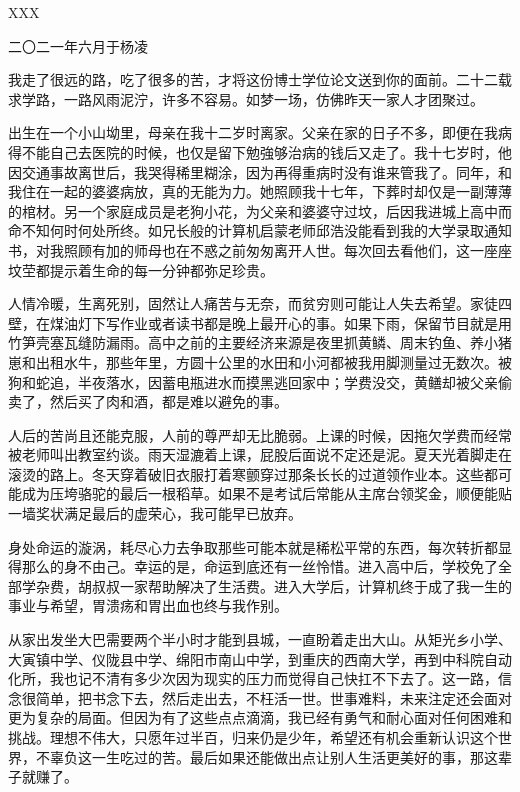 \begin{acknowledgement}
\begin{flushright}
         XXX

二〇二一年六月于\quad 杨凌
\end{flushright}

\newpage

我走了很远的路，吃了很多的苦，才将这份博士学位论文送到你的面前。二十二载求学路，一路风雨泥泞，许多不容易。如梦一场，仿佛昨天一家人才团聚过。

出生在一个小山坳里，母亲在我十二岁时离家。父亲在家的日子不多，即便在我病得不能自己去医院的时候，也仅是留下勉強够治病的钱后又走了。我十七岁时，他因交通事故离世后，我哭得稀里糊涂，因为再得重病时没有谁来管我了。同年，和我住在一起的婆婆病放，真的无能为力。她照顾我十七年，下葬时却仅是一副薄薄的棺材。另一个家庭成员是老狗小花，为父亲和婆婆守过坟，后因我进城上高中而命不知何时何处所终。如兄长般的计算机启蒙老师邱浩没能看到我的大学录取通知书，对我照顾有加的师母也在不惑之前匆匆离开人世。每次回去看他们，这一座座坟茔都提示着生命的每一分钟都弥足珍贵。

人情冷暖，生离死别，固然让人痛苦与无奈，而贫穷则可能让人失去希望。家徒四壁，在煤油灯下写作业或者读书都是晚上最开心的事。如果下雨，保留节目就是用竹笋壳塞瓦缝防漏雨。高中之前的主要经济来源是夜里抓黄鳞、周末钓鱼、养小猪崽和出租水牛，那些年里，方圆十公里的水田和小河都被我用脚测量过无数次。被狗和蛇追，半夜落水，因蓄电瓶进水而摸黑逃回家中；学费没交，黄鳝却被父亲偷卖了，然后买了肉和酒，都是难以避免的事。

人后的苦尚且还能克服，人前的尊严却无比脆弱。上课的时候，因拖欠学费而经常被老师叫出教室约谈。雨天湿漉着上课，屁股后面说不定还是泥。夏天光着脚走在滚烫的路上。冬天穿着破旧衣服打着寒颤穿过那条长长的过道领作业本。这些都可能成为压垮骆驼的最后一根稻草。如果不是考试后常能从主席台领奖金，顺便能贴一墙奖状满足最后的虚荣心，我可能早已放弃。

身处命运的漩涡，耗尽心力去争取那些可能本就是稀松平常的东西，每次转折都显得那么的身不由己。幸运的是，命运到底还有一丝怜惜。进入高中后，学校免了全部学杂费，胡叔叔一家帮助解决了生活费。进入大学后，计算机终于成了我一生的事业与希望，胃溃疡和胃出血也终与我作别。

从家出发坐大巴需要两个半小时才能到县城，一直盼着走出大山。从矩光乡小学、大寅镇中学、仪陇县中学、绵阳市南山中学，到重庆的西南大学，再到中科院自动化所，我也记不清有多少次因为现实的压力而觉得自己快扛不下去了。这一路，信念很简单，把书念下去，然后走出去，不枉活一世。世事难料，未来注定还会面对更为复杂的局面。但因为有了这些点点滴滴，我已经有勇气和耐心面对任何困难和挑战。理想不伟大，只愿年过半百，归来仍是少年，希望还有机会重新认识这个世界，不辜负这一生吃过的苦。最后如果还能做出点让别人生活更美好的事，那这辈子就赚了。


\end{acknowledgement}
